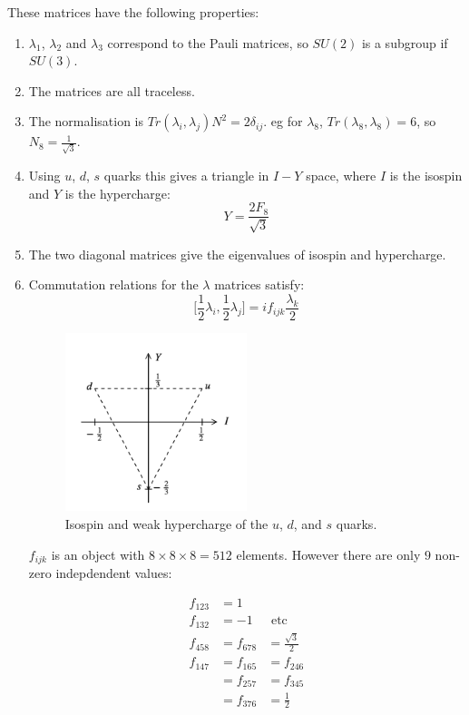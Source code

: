 These matrices have the following properties:
\begin{enumerate}
\item $\lambda_1$, $\lambda_2$ and $\lambda_3$ correspond to the Pauli matrices, so $SU(2)$ is a subgroup if $SU(3)$.
\item The matrices are all traceless.
\item The normalisation is $Tr(\lambda_i,\lambda_j)N^2 = 2\delta_{ij}$.  eg for $\lambda_8$, $Tr(\lambda_8, \lambda_8) = 6$, so $N_8 = \frac{1}{\sqrt{3}}$.
\item Using $u$, $d$, $s$ quarks this gives a triangle in $I-Y$ space, where $I$ is the isospin and $Y$ is the hypercharge:
\[
  Y = \frac{2F_8}{\sqrt{3}}
\]
\item The two diagonal matrices give the eigenvalues of isospin and hypercharge.
\item Commutation relations for the $\lambda$ matrices satisfy:
\[
  \Big[ \frac{1}{2}\lambda_i, \frac{1}{2}\lambda_j \Big] = if_{ijk}\frac{\lambda_k}{2}
\]

\begin{figure}[!htb]
  \begin{center}
    \includegraphics[width=0.5\textwidth]{images/web_feynman/image_47.png}
    \caption[Isospin and weak hypercharge of the $u$, $d$, and $s$ quarks]{Isospin and weak hypercharge of the $u$, $d$, and $s$ quarks.}
    \label{fig:ch12_IY_uds}
  \end{center}
\end{figure}

$f_{ijk}$ is an object with $8 \times 8 \times 8 = 512$ elements.  However there are only $9$ non-zero indepdendent values:

\begin{eqnarray*}
  f_{123} & = 1 & \\
  f_{132} & = -1 & \textrm{ etc} \\
  f_{458} & = f_{678} & = \frac{\sqrt{3}}{2} \\
  f_{147} & = f_{165} & = f_{246} \\
  & = f_{257} & = f_{345} \\
  & = f_{376} & = \frac{1}{2}
\end{eqnarray*}
\end{enumerate}

